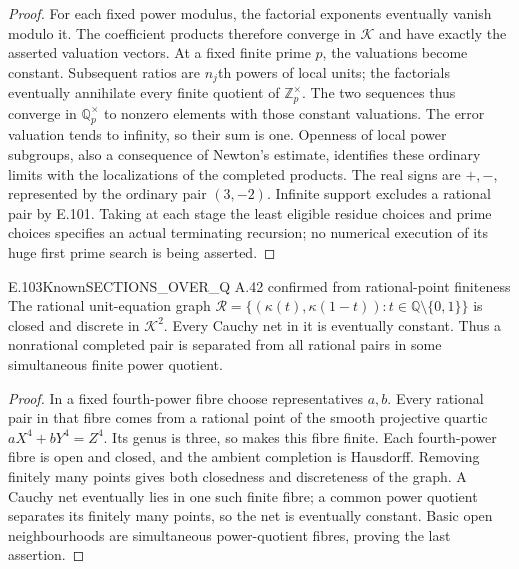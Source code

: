 \begin{proof}
For each fixed power modulus, the factorial exponents eventually
vanish modulo it. The coefficient products therefore converge in
$\mathcal K$ and have exactly the asserted valuation vectors. At a
fixed finite prime $p$, the valuations become constant. Subsequent
ratios are $n_j$th powers of local units; the factorials eventually
annihilate every finite quotient of $\mathbb Z_p^\times$. The two
sequences thus converge in $\mathbb Q_p^\times$ to nonzero elements
with those constant valuations. The error valuation tends to infinity,
so their sum is one. Openness of local power subgroups, also a
consequence of Newton's estimate, identifies these ordinary limits
with the localizations of the completed products. The real signs are
$+,-$, represented by the ordinary pair $(3,-2)$. Infinite support
excludes a rational pair by E.101. Taking at each stage the least
eligible residue choices and prime choices specifies an actual
terminating recursion; no numerical execution of its huge first
prime search is being asserted.
\end{proof}


\begin{result}{E.103}{Known}{SECTIONS\_OVER\_Q A.42 confirmed from rational-point finiteness}
The rational unit-equation graph
$\mathcal R=\{(\kappa(t),\kappa(1-t)):t\in\mathbb Q\setminus\{0,1\}\}$
is closed and discrete in $\mathcal K^2$. Every Cauchy net in it is
eventually constant. Thus a nonrational completed pair is separated
from all rational pairs in some simultaneous finite power quotient.
\end{result}
\begin{proof}
In a fixed fourth-power fibre choose representatives $a,b$.
Every rational pair in that fibre comes from a rational point of the
smooth projective quartic $aX^4+bY^4=Z^4$. Its genus is three, so
\citet[Satz~7, p.~365]{Faltings1983} makes this fibre finite. Each fourth-power
fibre is open and closed, and the ambient completion is Hausdorff.
Removing finitely many points gives both closedness and discreteness
of the graph. A Cauchy net eventually lies in one such finite fibre;
a common power quotient separates its finitely many points, so the
net is eventually constant. Basic open neighbourhoods are simultaneous
power-quotient fibres, proving the last assertion.
\end{proof}

